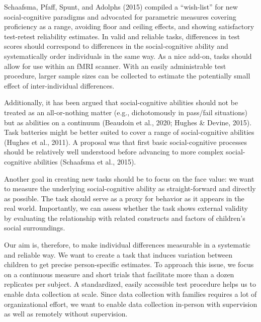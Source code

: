 \documentclass[
  man,floatsintext]{apa6}
\begin{document}
Schaafsma, Pfaff, Spunt, and Adolphs (2015) compiled a ``wish-list'' for new social-cognitive paradigms and advocated for parametric measures covering proficiency as a range, avoiding floor and ceiling effects, and showing satisfactory test-retest reliability estimates.
In valid and reliable tasks, differences in test scores should correspond to differences in the social-cognitive ability and systematically order individuals in the same way.
As a nice add-on, tasks should allow for use within an fMRI scanner.
With an easily administrable test procedure, larger sample sizes can be collected to estimate the potentially small effect of inter-individual differences.

Additionally, it has been argued that social-cognitive abilities should not be treated as an all-or-nothing matter (e.g., dichotomously in pass/fail situations) but as abilities on a continuum (Beaudoin et al., 2020; Hughes \& Devine, 2015).
Task batteries might be better suited to cover a range of social-cognitive abilities (Hughes et al., 2011).
A proposal was that first basic social-cognitive processes should be relatively well understood before advancing to more complex social-cognitive abilities (Schaafsma et al., 2015).

Another goal in creating new tasks should be to focus on the face value:
we want to measure the underlying social-cognitive ability as straight-forward and directly as possible.
The task should serve as a proxy for behavior as it appears in the real world.
Importantly, we can assess whether the task shows external validity by evaluating the relationship with related constructs and factors of children's social surroundings.

Our aim is, therefore, to make individual differences measurable in a systematic and reliable way.
We want to create a task that induces variation between children to get precise person-specific estimates.
To approach this issue, we focus on a continuous measure and short trials that facilitate more than a dozen replicates per subject.
A standardized, easily accessible test procedure helps us to enable data collection at scale.
Since data collection with families requires a lot of organizational effort, we want to enable data collection in-person with supervision as well as remotely without supervision.
\end{document}
